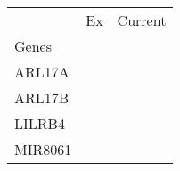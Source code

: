 \begin{tabular}{lcc}
\toprule
{} & Ex & Current \\
Genes   &    &         \\
\midrule
ARL17A  &    &         \\
ARL17B  &    &         \\
LILRB4  &    &         \\
MIR8061 &    &         \\
\bottomrule
\end{tabular}
